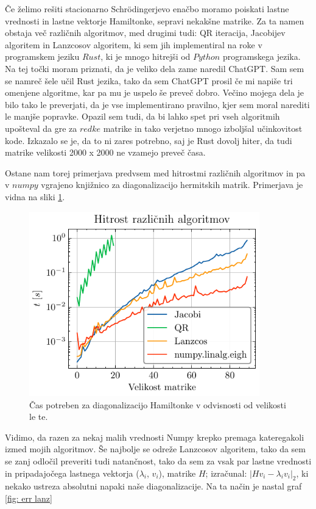\documentclass[slovene,11pt,a4paper]{article}
\begin{document}
Če želimo rešiti stacionarno Schr\"odingerjevo enačbo moramo poiskati lastne vrednosti in lastne vektorje Hamiltonke, sepravi nekakšne matrike. Za ta namen obstaja več različnih algoritmov, med drugimi tudi: QR iteracija, Jacobijev algoritem in Lanzcosov algoritem, ki sem jih implementiral na roke v programskem jeziku $Rust$, ki je mnogo hitrejši od $Python$ programskega jezika. Na tej točki moram priznati, da je veliko dela zame naredil ChatGPT. Sam sem se namreč šele učil Rust jezika, tako da sem ChatGPT prosil če mi napiše tri omenjene algoritme, kar pa mu je uspelo še preveč dobro. Večino mojega dela je bilo tako le  preverjati, da je vse implementirano pravilno, kjer sem moral narediti le manjše popravke. Opazil sem tudi, da bi lahko spet pri vseh algoritmih upošteval da gre za $redke$ matrike in tako verjetno mnogo izboljšal učinkovitost kode. Izkazalo se je, da to ni zares potrebno, saj je Rust dovolj hiter, da tudi matrike velikosti 2000 x 2000 ne vzamejo preveč časa. 

Ostane nam torej primerjava predvsem med hitrostmi različnih algoritmov in pa v $numpy$ vgrajeno knjižnico za diagonalizacijo hermitskih matrik. Primerjava je vidna na sliki \ref{fig: algos}.

\begin{figure}[ht]
\begin{center}
  \includegraphics[width=10cm]{graphs/algos.pdf}
  \caption{Čas potreben za diagonalizacijo Hamiltonke v odvisnosti od velikosti le te.}
  \label{fig: algos}
\end{center}
\end{figure}

\newpage
Vidimo, da razen za nekaj malih vrednosti Numpy krepko premaga kateregakoli izmed mojih algoritmov. Še najbolje se odreže Lanzcosov algoritem, tako da sem se zanj odločil preveriti tudi natančnost, tako da sem za vsak par lastne vrednosti in pripadajočega lastnega vektorja ($\lambda_i$, $v_i$), matrike $H$; izračunal: $|Hv_i - \lambda_iv_i|_2$, ki nekako ustreza absolutni napaki naše diagonalizacije. Na ta način je nastal graf \ref{fig: err lanz}
\end{document}
